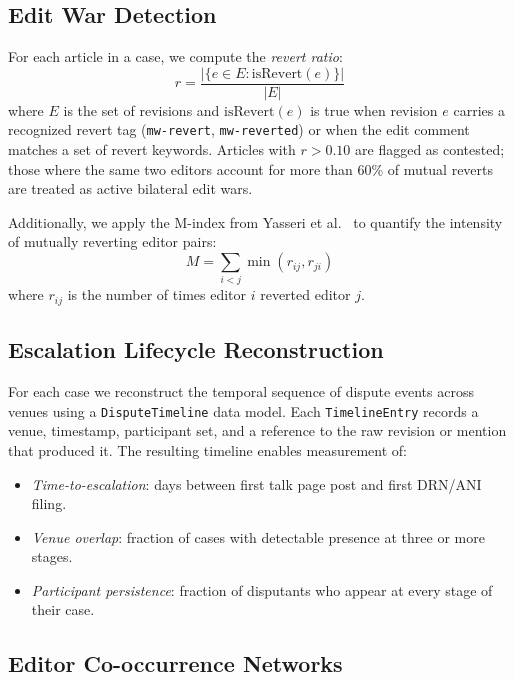\documentclass[conference]{IEEEtran}
\begin{document}
\subsection{Edit War Detection}

For each article in a case, we compute the \emph{revert ratio}:
\begin{equation}
r = \frac{|\{e \in E : \text{isRevert}(e)\}|}{|E|}
\end{equation}
where $E$ is the set of revisions and $\text{isRevert}(e)$ is true when
revision $e$ carries a recognized revert tag (\texttt{mw-revert},
\texttt{mw-reverted}) or when the edit comment matches a set of revert
keywords. Articles with $r > 0.10$ are flagged as contested; those where the
same two editors account for more than 60\% of mutual reverts are treated as
active bilateral edit wars.

Additionally, we apply the M-index from Yasseri et al.~\cite{b_yasseri2012} to
quantify the intensity of mutually reverting editor pairs:
\begin{equation}
M = \sum_{i < j} \min(r_{ij}, r_{ji})
\end{equation}
where $r_{ij}$ is the number of times editor $i$ reverted editor $j$.

\subsection{Escalation Lifecycle Reconstruction}

For each case we reconstruct the temporal sequence of dispute events across
venues using a \texttt{DisputeTimeline} data model. Each
\texttt{TimelineEntry} records a venue, timestamp, participant
set, and a reference to the raw revision or mention that produced it. The resulting
timeline enables measurement of:

\begin{itemize}
    \item \emph{Time-to-escalation}: days between first talk page post and
          first DRN/ANI filing.
    \item \emph{Venue overlap}: fraction of cases with detectable presence at
          three or more stages.
    \item \emph{Participant persistence}: fraction of disputants who appear
          at every stage of their case.
\end{itemize}

\subsection{Editor Co-occurrence Networks}
\end{document}
